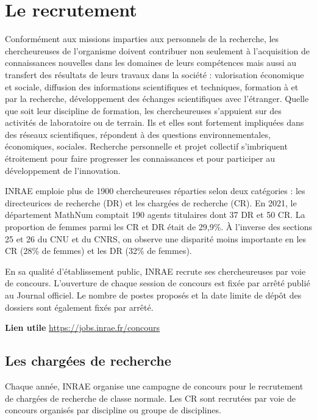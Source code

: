 \section{ Le recrutement}
Conform\'ement aux missions imparties aux personnels de la recherche, les chercheur\mp euse\mp s de l'organisme doivent contribuer non seulement \`a l'acquisition de connaissances nouvelles dans les domaines de leurs comp\'etences mais aussi au transfert des r\'esultats de leurs travaux dans la soci\'et\'e : valorisation \'economique et sociale, diffusion des informations scientifiques et techniques, formation \`a et par la recherche, d\'eveloppement des \'echanges scientifiques avec l'\'etranger. 
Quelle que soit leur discipline de formation, les chercheur\mp euse\mp s s'appuient sur des activit\'es de laboratoire ou de \og terrain\fg{}. Ils et elles sont fortement impliqu\'e\mp e\mp s dans des r\'eseaux scientifiques, r\'epondent \`a des questions environnementales, \'economiques, sociales. Recherche personnelle et projet collectif s'imbriquent \'etroitement pour faire progresser les connaissances et pour participer au d\'eveloppement de l'innovation.

INRAE emploie plus de 1900 chercheur\mp euse\mp s  r\'eparti\mp e\mp s selon deux cat\'egories : les directeur\mp ice\mp s de recherche (DR) et les charg\'e\mp e\mp s de recherche (CR). %
En 2021, le d\'epartement MathNum comptait 190 agents titulaires dont 37 DR et 50 CR. La proportion de femmes parmi les CR et DR \'etait de 29,9\%. \`A l'inverse des sections 25 et 26 du CNU et du CNRS, on observe une disparit\'e moins importante en les CR (28\% de femmes) et les DR (32\% de femmes).

En sa qualit\'e d'\'etablissement public, INRAE recrute ses chercheur\mp euse\mp s par voie de concours. L'ouverture de chaque session de concours est fix\'ee par arr\^et\'e publi\'e au Journal officiel. Le nombre de postes propos\'es et la date limite de d\'ep\^ot des dossiers sont \'egalement fix\'es par arr\^et\'e.

\textbf{Lien utile\hspace{0.5em}} \url{https://jobs.inrae.fr/concours}

\subsection{ Les charg\'e\mp e\mp s de recherche}

Chaque ann\'ee, INRAE organise une campagne de concours pour le recrutement de  charg\'e\mp e\mp s de recherche de classe normale. Les CR sont recrut\'e\mp e\mp s par voie de concours organis\'es par discipline ou groupe de disciplines. 

